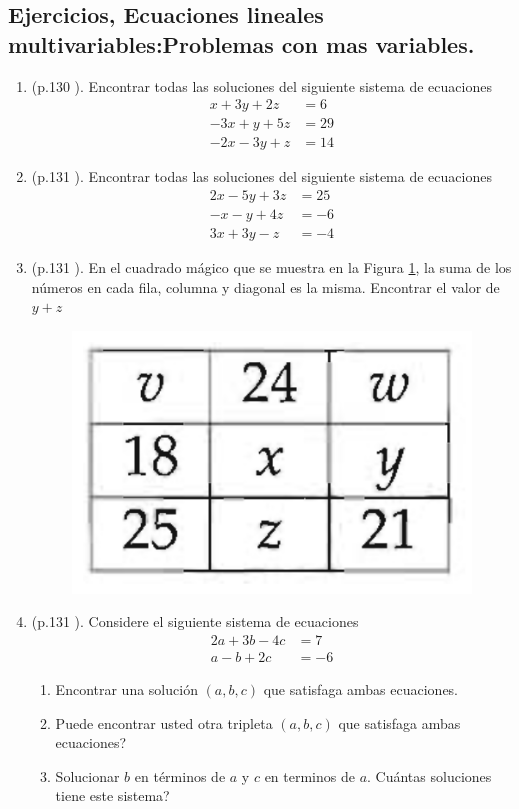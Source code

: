\newpage

\begin{center}
	\vspace{-1cm}
	\subsection*{ Ejercicios, Ecuaciones lineales multivariables:Problemas con mas variables.}
\end{center}	
\begin{enumerate}
	\item (p.130 \cite{Aops_algebra}). Encontrar todas las soluciones del siguiente sistema de ecuaciones 
	\begin{align*}
	x+3y+2z &= 6\\
	-3x+y+5z &= 29\\
	-2x-3y+z &= 14
	\end{align*}
	
	\item (p.131 \cite{Aops_algebra}). Encontrar todas las soluciones del siguiente sistema de ecuaciones 
	\begin{align*}
	2x-5y+3z &= 25\\
	-x-y+4z &= -6\\
	3x + 3y -z &= -4
	\end{align*}
	
	\item (p.131 \cite{Aops_algebra}). En el cuadrado mágico que se muestra en la Figura \ref{fig:cuadrado_magico}, la suma de los números en cada fila, columna y diagonal es la misma. Encontrar el valor de $y+z$
	\begin{figure}[H]
		\centering
		\includegraphics[width=0.25\linewidth]{Algebra/imgs/cuadrado_magico.png}
		\label{fig:cuadrado_magico}
	\end{figure}
	
	\item (p.131 \cite{Aops_algebra}). 	Considere el siguiente sistema de ecuaciones
	\begin{align*}
	2a+3b-4c &= 7\\
	a-b+2c &= -6
	\end{align*}
	\begin{enumerate}[label=(\Alph*)]
		\item Encontrar una solución $(a,b,c)$ que satisfaga ambas ecuaciones.
		\item Puede encontrar usted otra tripleta $(a,b,c)$ que satisfaga ambas ecuaciones?
		\item Solucionar $b$ en términos de $a$ y $c$ en terminos de $a$. Cuántas soluciones tiene este sistema?
	\end{enumerate}
	
\end{enumerate}
\newpage


